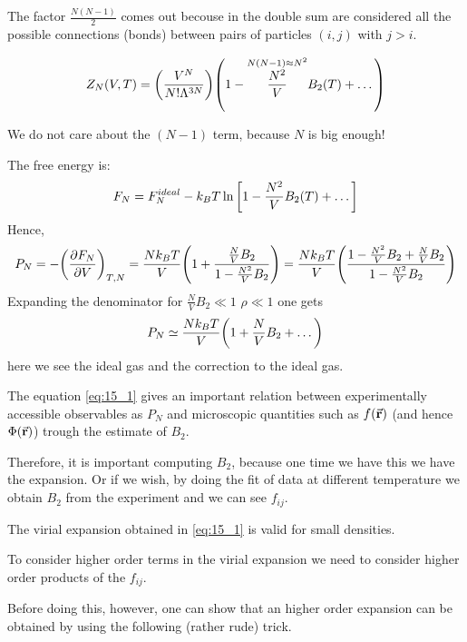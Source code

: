 \documentclass[../main/main.tex]{subfiles}
\begin{document}
\begin{remark}
The factor \( \frac{N(N-1)}{2} \) comes out becouse in the double sum are considered all the possible connections (bonds) between pairs of particles \( (i,j) \) with \( j>i \).
\end{remark}
\begin{equation}
  Z_N (V,T) = \qty(\frac{V^N}{N! \Lambda ^{3N}}) \qty(1- \overset{N(N-1) \approx N^2}{\frac{N^2}{V}} B_2 (T)+ \dots)
\end{equation}
\begin{remark}
We do not care about the \( (N-1) \) term, because \( N \) is big enough!
\end{remark}
The free energy is:
\begin{equation}
  F_N = F_N^{ideal} - k_B T \ln{\qty[1-\frac{N^2}{V}B_2 (T)+ \dots] }
\end{equation}
Hence,
\begin{equation}
  P_N = - \qty(\pdv{F_N}{V} )_{T,N} = \frac{N k_B T}{V} \qty(1+ \frac{\frac{N}{V}B_2}{1- \frac{N^2}{V}B_2})
  = \frac{N k_B T}{V} \qty(\frac{1 -\frac{N^2}{V} B_2 + \frac{N}{V} B_2 }{1- \frac{N^2}{V} B_2})
\end{equation}
Expanding the denominator for \( \frac{N}{V} B_2 \ll 1 \) \( \rho \ll 1 \) one gets
\begin{equation}
  P_N \simeq \frac{N k_B T}{V} \qty(1+\frac{N}{V}B_2 + \dots)
  \label{eq:15_1}
\end{equation}
here we see the ideal gas and the correction to the ideal gas.
\begin{remark}
The equation \eqref{eq:15_1} gives an important relation between experimentally accessible observables as \( P_N \) and microscopic quantities such as \( f(\va{r}) \) (and hence \( \Phi (\va{r}) \)) trough the estimate of \( B_2 \).

Therefore, it is important computing \( B_2 \), because one time we have this we have the expansion. Or if we wish, by doing the fit of data at different temperature we obtain \( B_2 \) from the experiment and we can see \( f_{ij} \).
\end{remark}
\begin{remark}
The virial expansion obtained in \eqref{eq:15_1} is valid for small densities.
\end{remark}


To consider higher order terms in the virial expansion we need to consider higher order products of the \( f_{ij} \).

Before doing this, however, one can show that an higher order expansion can be obtained by using the following (rather rude) trick.
\end{document}
